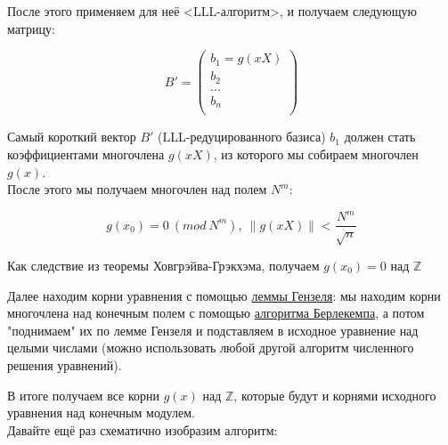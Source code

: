 \documentclass[12pt,a4paper]{scrartcl}
\begin{document}
После этого применяем для неё <LLL-алгоритм>, и получаем следующую матрицу:

$$B'=\begin{pmatrix}
	b_1=g(xX)\\
	b_2\\
	...\\
	b_n\\
\end{pmatrix}$$

Самый короткий вектор $B'$ (LLL-редуцированного базиса) $b_1$ должен стать коэффициентами многочлена $g(xX)$, из которого мы собираем многочлен $g(x)$. \\

После этого мы получаем многочлен над полем $N^m$:

$$g(x_0)=0\ (mod\ N^m),\ \parallel g(xX) \parallel < \dfrac{N^m}{\sqrt{n}}$$ 

Как следствие из теоремы Ховгрэйва-Грэкхэма, получаем $g(x_0)= 0$ над $\mathbb{Z}$

Далее находим корни уравнения с помощью \href{https://yatb.kksctf.ru/}{леммы Гензеля}: мы находим корни многочлена над конечным полем с помощью \href{https://yatb.kksctf.ru/}{алгоритма Берлекемпа}, а потом "поднимаем" их по лемме Гензеля и подставляем в исходное уравнение над целыми числами (можно использовать любой другой алгоритм численного решения уравнений).

В итоге получаем все корни $g(x)$ над $\mathbb{Z}$, которые будут и корнями исходного уравнения над конечным модулем.\\

Давайте ещё раз схематично изобразим алгоритм:\\
\end{document}

